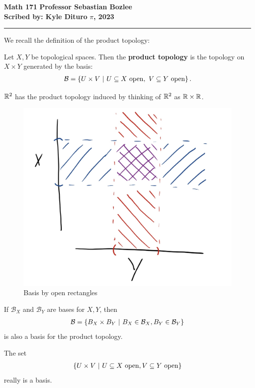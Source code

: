 \documentclass[12pt, twosided]{article}
\begin{document}
\noindent \textbf{Math 171} \hfill \textbf{Professor Sebastian Bozlee} \\
\textbf{Scribed by: Kyle Dituro} \hfill \textbf{\(\pi\), 2023}\hrule
\vspace{.2in}

We recall the definition of the product topology:

\begin{df}
  Let \(X , Y\) be topological spaces. Then the \textbf{product topology} is the topology on \(X \times Y\) generated by the basis:
  \begin{align*}
    \mathcal{B} = \opn U \times V \stbar U \subseteq X\ \mathrm{open},\ V \subseteq Y\ \mathrm{open} \cls.
  \end{align*}
\end{df}

\begin{exa}
  \(\mathbb{R}^2\) has the product topology induced by thinking of \(\mathbb{R}^2\) as \(\mathbb{R}\times \mathbb{R}\).

  \begin{figure}[h]
    \centering
    \includegraphics[width=.5\textwidth]{ProductTop}
    \caption{Basis by open rectangles}
    \label{fig:dubious}
  \end{figure}
\end{exa}

\begin{fact}
  If \(\mathcal{B}_X\) and \(\mathcal{B}_Y\) are bases for \(X, Y\), then
  \begin{align*}
    \mathcal{B} = \left\{ B_X \times B_Y \ \middle\vert\  B_X \in \mathcal{B}_X, B_Y \in \mathcal{B}_Y \right\}
  \end{align*}
  is also a basis for the product topology.
\end{fact}

\begin{prop}
  The set
  \begin{align*}
    \opn U \times V \stbar U \subseteq X\ \mathrm{open}, V \subseteq Y\ \mathrm{open} \cls
  \end{align*}
  really is a basis.
\end{prop}
\end{document}
